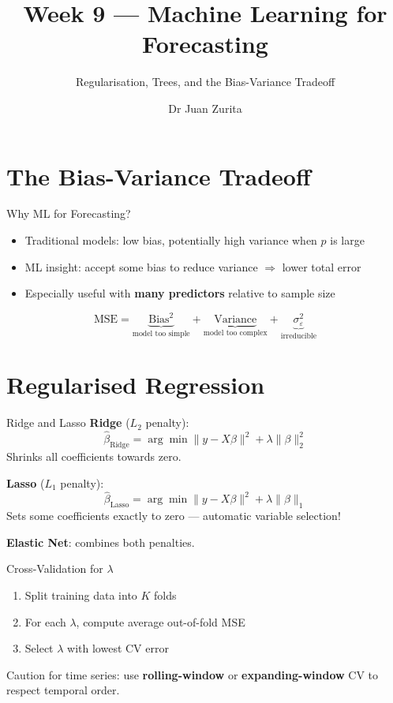 \documentclass[aspectratio=169, 10pt]{beamer}
\title{Week 9 --- Machine Learning for Forecasting}
\subtitle{Regularisation, Trees, and the Bias-Variance Tradeoff}
\author{Dr Juan Zurita}
\institute{Economic \& Business Forecasting\\
The University of Edinburgh~$\cdot$~School of Economics}
\date{}
\begin{document}
\maketitle


\section{The Bias-Variance Tradeoff}

\begin{frame}{Why ML for Forecasting?}
\begin{itemize}
    \item Traditional models: low bias, potentially high variance when $p$ is large
    \item \alert{ML insight}: accept some bias to reduce variance $\Rightarrow$ lower total error
    \item Especially useful with \textbf{many predictors} relative to sample size
\end{itemize}

\[
\text{MSE} = \underbrace{\text{Bias}^2}_{\text{model too simple}} + \underbrace{\text{Variance}}_{\text{model too complex}} + \underbrace{\sigma^2_\varepsilon}_{\text{irreducible}}
\]
\end{frame}

\section{Regularised Regression}

\begin{frame}{Ridge and Lasso}
\textbf{Ridge} ($L_2$ penalty):
\[
\hat\beta_{\text{Ridge}} = \arg\min \|y - X\beta\|^2 + \lambda\|\beta\|_2^2
\]
Shrinks all coefficients towards zero.

\vspace{0.5em}
\textbf{Lasso} ($L_1$ penalty):
\[
\hat\beta_{\text{Lasso}} = \arg\min \|y - X\beta\|^2 + \lambda\|\beta\|_1
\]
\alert{Sets some coefficients exactly to zero} --- automatic variable selection!

\vspace{0.5em}
\textbf{Elastic Net}: combines both penalties.
\end{frame}

\begin{frame}{Cross-Validation for $\lambda$}
\begin{enumerate}
    \item Split training data into $K$ folds
    \item For each $\lambda$, compute average out-of-fold MSE
    \item Select $\lambda$ with lowest CV error
\end{enumerate}

\vspace{0.5em}
\alert{Caution for time series:} use \textbf{rolling-window} or \textbf{expanding-window} CV to respect temporal order.
\end{frame}
\end{document}
